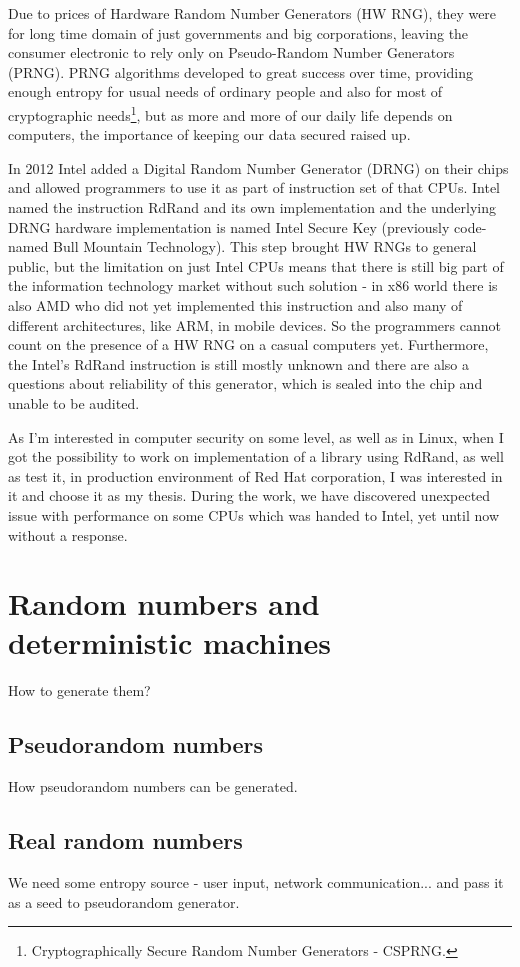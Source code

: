 Due to prices of Hardware Random Number Generators (HW RNG), they were for long time domain of just governments and big corporations,%
leaving the consumer electronic to rely only on Pseudo-Random Number Generators (PRNG). PRNG algorithms developed to great success over time, providing enough entropy for usual needs of ordinary people and also for most of cryptographic needs\footnote{Cryptographically Secure Random Number Generators - CSPRNG.}, but as more and more of our daily life depends on computers, the importance of keeping our data secured raised up. 

In 2012 %
Intel added a Digital Random Number Generator (DRNG) on their chips and allowed programmers to use it as part of instruction set of that CPUs. Intel named the instruction RdRand and its own implementation and the underlying DRNG hardware implementation is named Intel Secure Key (previously code-named Bull Mountain Technology)\cite{IntelDRNGAnalysis}. This step brought HW RNGs to general public, but the limitation on just Intel CPUs means that there is still big part of the information technology market without such solution - in x86 world there is also AMD who did not yet implemented this instruction and also many of different architectures, like ARM, in mobile devices. So the programmers cannot count on the presence of a HW RNG on a casual computers yet. Furthermore, the Intel's RdRand instruction is still mostly unknown and there are also a questions about reliability of this generator, which is sealed into the chip and unable to be audited.\cite{TheodoreTsoNSA}

As I'm interested in computer security on some level, as well as in Linux, when I got the possibility to work on implementation of a library using RdRand, as well as test it, in production environment of Red Hat corporation, I was interested in it and choose it as my thesis. During the work, we have discovered unexpected issue with performance on some CPUs which was handed to Intel, yet until now without a response.


\chapter{Random numbers and deterministic machines}
How to generate them?
\section{Pseudorandom numbers}
How pseudorandom numbers can be generated.

\section{Real random numbers}
We need some entropy source - user input, network communication... and pass it as a seed to pseudorandom generator.
